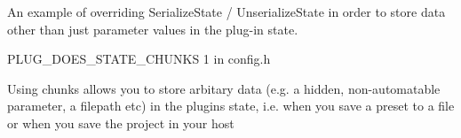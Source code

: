 An example of overriding Serialize\+State / Unserialize\+State in order to store data other than just parameter values in the plug-\/in state.

P\+L\+U\+G\+\_\+\+D\+O\+E\+S\+\_\+\+S\+T\+A\+T\+E\+\_\+\+C\+H\+U\+N\+KS 1 in config.\+h

Using chunks allows you to store arbitary data (e.\+g. a hidden, non-\/automatable parameter, a filepath etc) in the plugin\textquotesingle{}s state, i.\+e. when you save a preset to a file or when you save the project in your host 
